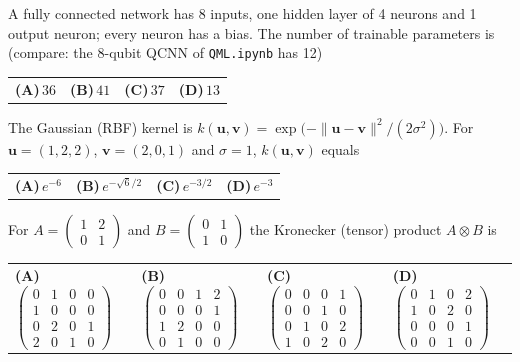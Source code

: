 \documentclass[11pt,a4paper]{article}
\newcommand{\optlabel}[1]{\textbf{(#1)}}
\newenvironment{qitem}[1]{\begin{list}{}{\setlength{\leftmargin}{3.3em}\setlength{\labelwidth}{3.1em}%
  \setlength{\labelsep}{0.2em}\setlength{\topsep}{3pt}\setlength{\parsep}{3pt}}\item[\textbf{Q.#1}\hfill]}{\end{list}}
\newcommand{\qsep}{\par\vspace{2pt}{\color{black!15}\hrule}\vspace{4pt}}
\begin{document}
\begin{qitem}{8}
A fully connected network has 8 inputs, one hidden layer of 4 neurons and 1 output neuron; every neuron has a
bias. The number of trainable parameters is (compare: the 8-qubit QCNN of \texttt{QML.ipynb} has 12)
\par\smallskip\noindent\begin{tabularx}{\linewidth}{@{}*{4}{L}@{}}
\optlabel{A}\,$36$ & \optlabel{B}\,$41$ & \optlabel{C}\,$37$ & \optlabel{D}\,$13$
\end{tabularx}
\end{qitem}
\qsep

\begin{qitem}{9}
The Gaussian (RBF) kernel is $k(\mathbf u, \mathbf v) = \exp\!\big(-\|\mathbf u - \mathbf v\|^2/(2\sigma^2)\big)$. For
$\mathbf u = (1, 2, 2)$, $\mathbf v = (2, 0, 1)$ and $\sigma = 1$, $k(\mathbf u, \mathbf v)$ equals
\par\smallskip\noindent\begin{tabularx}{\linewidth}{@{}*{4}{L}@{}}
\optlabel{A}\,$e^{-6}$ & \optlabel{B}\,$e^{-\sqrt6/2}$ & \optlabel{C}\,$e^{-3/2}$ & \optlabel{D}\,$e^{-3}$
\end{tabularx}
\end{qitem}
\qsep

\begin{qitem}{10}
For $A = \begin{pmatrix}1 & 2\\ 0 & 1\end{pmatrix}$ and $B = \begin{pmatrix}0 & 1\\ 1 & 0\end{pmatrix}$ the Kronecker
(tensor) product $A \otimes B$ is
\par\smallskip\noindent\begin{tabularx}{\linewidth}{@{}*{4}{L}@{}}
\optlabel{A}\,$\begin{pmatrix}0&1&0&0\\1&0&0&0\\0&2&0&1\\2&0&1&0\end{pmatrix}$ & \optlabel{B}\,$\begin{pmatrix}0&0&1&2\\0&0&0&1\\1&2&0&0\\0&1&0&0\end{pmatrix}$ & \optlabel{C}\,$\begin{pmatrix}0&0&0&1\\0&0&1&0\\0&1&0&2\\1&0&2&0\end{pmatrix}$ & \optlabel{D}\,$\begin{pmatrix}0&1&0&2\\1&0&2&0\\0&0&0&1\\0&0&1&0\end{pmatrix}$
\end{tabularx}
\end{qitem}
\qsep
\end{document}
